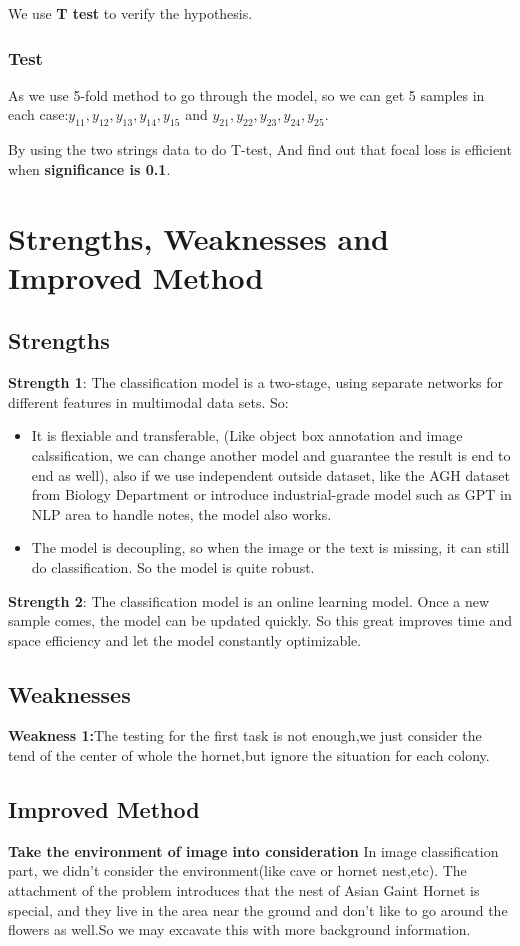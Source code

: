 \documentclass[12pt]{article}
\begin{document}
We use \textbf{T test} to verify the hypothesis.
\subsubsection{Test}
As we use 5-fold method to go through the model, so we can get 5 samples in each case:$y_{11},y_{12},y_{13},y_{14},y_{15}$ and $y_{21},y_{22},y_{23},y_{24},y_{25}$.

By using the two strings data to do T-test, And find out that focal loss is efficient when \textbf{significance is 0.1}.



\section{Strengths, Weaknesses and Improved Method}
\subsection{Strengths}
\textbf{Strength 1}: The classification model is a two-stage, using separate networks for different features in multimodal data sets. So:
\begin{itemize}
	\item  It is flexiable and transferable, (Like object box annotation and image calssification, we can change another model and guarantee the result is end to end as well), also if we use independent outside dataset, like the AGH dataset from Biology Department or introduce industrial-grade model such as GPT in NLP area to handle notes, the model also works.
	\item  The model is decoupling, so when the image or the text is missing, it can still do classification. So the model is quite robust.
\end{itemize}

\textbf{Strength 2}: The classification model is an online learning model. Once a new sample comes, the model can be updated quickly. So this great improves time and space efficiency and let the model constantly optimizable.

\subsection{Weaknesses}
\textbf{Weakness 1:}The testing for the first task is not enough,we just consider the tend of the center of whole the hornet,but ignore the situation for each colony.

\subsection{Improved Method}
\textbf{Take the environment of image into consideration}
In image classification part, we didn't consider the environment(like cave or hornet nest,etc). The attachment of the problem introduces that the nest of Asian Gaint Hornet is special, and they live in the area near the ground and don't like to go around the flowers as well.So we may excavate this with more background information.
\end{document}
